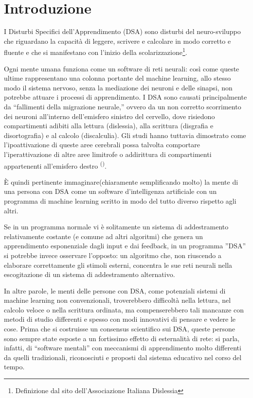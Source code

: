 \documentclass[portrait,a4paper]{article} %
\begin{document}
\section{Introduzione}  
I Disturbi Specifici dell’Apprendimento (DSA) sono disturbi del neuro-sviluppo che riguardano la capacità di leggere, scrivere e calcolare in modo corretto e fluente e che si manifestano con l'inizio della scolarizzazione\footnote{Definizione dal sito dell’Associazione Italiana Dislessia}.
\par
Ogni mente umana funziona come un software di reti neurali: così come queste ultime rappresentano una colonna portante del machine learning, allo stesso modo il sistema nervoso, senza la mediazione dei neuroni e delle sinapsi, non potrebbe attuare i processi di apprendimento.
I DSA sono causati principalmente da “fallimenti della migrazione neurale,” ovvero da un non corretto scorrimento dei neuroni all’interno dell’emisfero sinistro del cervello, dove risiedono compartimenti adibiti alla lettura (dislessia), alla scrittura (disgrafia e disortografia) e al calcolo (discalculia).
Gli studi hanno tuttavia dimostrato come l'ipoattivazione di queste aree cerebrali possa talvolta comportare l'iperattivazione di altre aree limitrofe o addirittura di compartimenti appartenenti all’emisfero destro \textsuperscript{(\cite{dev_dys})}.
\par
È quindi pertinente immaginare(chiaramente semplificando molto) la mente di una persona con DSA come un software d’intelligenza artificiale con un programma di machine learning scritto in modo del tutto diverso rispetto agli altri.
\par
Se in un programma normale vi è solitamente un sistema di addestramento relativamente costante (e comune ad altri algoritmi) che genera un apprendimento esponenziale dagli input e dai feedback, in un programma ''DSA'' si potrebbe invece osservare l’opposto: un algoritmo che, non riuscendo a elaborare correttamente gli stimoli esterni, concentra le sue reti neurali nella escogitazione di un sistema di addestramento alternativo.
\par
In altre parole, le menti delle persone con DSA, come potenziali sistemi di machine learning non convenzionali, troverebbero difficoltà nella lettura, nel calcolo veloce o nella scrittura ordinata, ma compenserebbero tali mancanze con metodi di studio differenti e spesso con modi innovativi di pensare e vedere le cose.
Prima che si costruisse un consensus scientifico sui DSA, queste persone sono sempre state esposte a un fortissimo effetto di esternalità di rete: si parla, infatti, di “software mentali” con meccanismi di apprendimento molto differenti da quelli tradizionali, riconosciuti e proposti dal sistema educativo nel corso del tempo.
\end{document}
